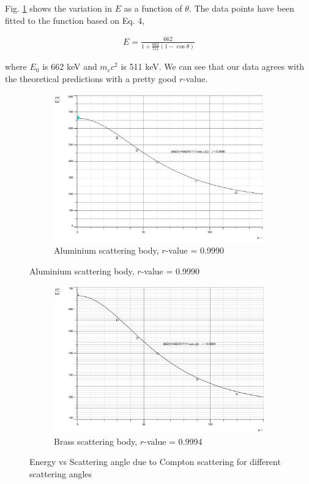 \vspace{2em}

Fig. \ref{plot2} shows the variation in $E$ as a function of $\theta$. The data points have been fitted to the function based on Eq. 4,

\begin{align*}
    E = \frac{662}{1+\frac{662}{511}(1-\cos \theta)}
\end{align*}

where $E_0$ is 662 keV and $m_ec^2$ is 511 keV. We can see that our data agrees with the theoretical predictions with a pretty good $r$-value.

\begin{figure}[H]
    \begin{subfigure}{\linewidth}
        \centering
        \includegraphics[width=1\columnwidth]{images/al_fit.pdf}
        \caption{Aluminium scattering body, $r$-value = 0.9990}
    \end{subfigure}
\end{figure}
\begin{figure}[H]
    \ContinuedFloat
    \begin{subfigure}{\linewidth}
        \centering
        \includegraphics[width=1\columnwidth]{images/cu_fit.pdf}
        \caption{Brass scattering body, $r$-value = 0.9994}
    \end{subfigure}
    \caption{Energy vs Scattering angle due to Compton scattering for different scattering angles}
    \label{plot2}
\end{figure}


